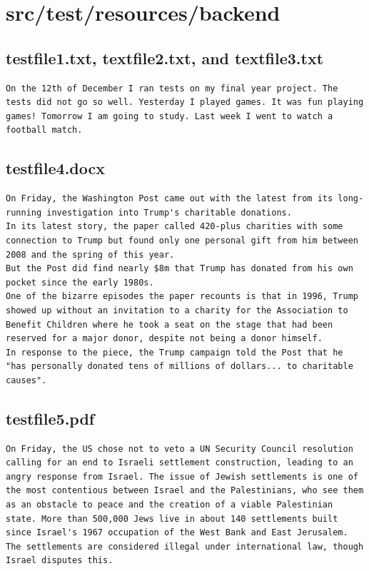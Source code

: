 \section{src/test/resources/backend}
\subsection{testfile1.txt, textfile2.txt, and textfile3.txt}
\begin{lstlisting}
On the 12th of December I ran tests on my final year project. The tests did not go so well. Yesterday I played games. It was fun playing games! Tomorrow I am going to study. Last week I went to watch a football match.
\end{lstlisting}
\subsection{testfile4.docx}
\begin{lstlisting}
On Friday, the Washington Post came out with the latest from its long-running investigation into Trump's charitable donations. 
In its latest story, the paper called 420-plus charities with some connection to Trump but found only one personal gift from him between 2008 and the spring of this year. 
But the Post did find nearly $8m that Trump has donated from his own pocket since the early 1980s.
One of the bizarre episodes the paper recounts is that in 1996, Trump showed up without an invitation to a charity for the Association to Benefit Children where he took a seat on the stage that had been reserved for a major donor, despite not being a donor himself. 
In response to the piece, the Trump campaign told the Post that he "has personally donated tens of millions of dollars... to charitable causes".
\end{lstlisting}
\subsection{testfile5.pdf}
\begin{lstlisting}
On Friday, the US chose not to veto a UN Security Council resolution calling for an end to Israeli settlement construction, leading to an angry response from Israel. The issue of Jewish settlements is one of the most contentious between Israel and the Palestinians, who see them as an obstacle to peace and the creation of a viable Palestinian state. More than 500,000 Jews live in about 140 settlements built since Israel's 1967 occupation of the West Bank and East Jerusalem. The settlements are considered illegal under international law, though Israel disputes this.
\end{lstlisting}